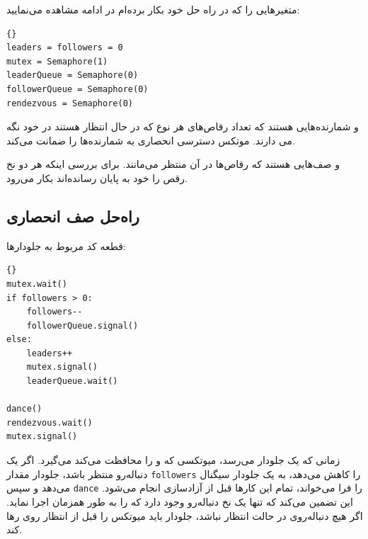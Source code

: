 \documentclass{book}
\newcommand{\clearemptydoublepage}{\newpage\cleardoublepage}
\begin{document}
    متغیرهایی را که در راه حل خود بکار برده‌ام در ادامه مشاهده می‌نمایید:

\begin{latin}
\begin{latin}
\begin{lstlisting}[title={\rl{راهنمای صف}}]{}
leaders = followers = 0
mutex = Semaphore(1)
leaderQueue = Semaphore(0)
followerQueue = Semaphore(0)
rendezvous = Semaphore(0)
\end{lstlisting}
\end{latin}
\end{latin}

     و 
    شمارنده‌هایی هستند که تعداد رقاص‌های هر نوع که در حال انتظار هستند در خود نگه می دارند. 
    موتکس دسترسی انحصاری به شمارنده‌ها را ضمانت می‌کند.

     و 
صف‌هایی هستند که رقاص‌ها در آن  منتظر می‌مانند. 
 برای بررسی اینکه هر دو نخ رقص را خود به پایان‌ رسانده‌اند بکار می‌رود. 


\clearemptydoublepage
\subsection {راه‌حل صف انحصاری}

    قطعه کد مربوط به جلو‌دارها:

\begin{latin}
\begin{latin}
\begin{lstlisting}[title=\rl{راه حل صف (جلودارها)}]{}
mutex.wait()
if followers > 0:
    followers--
    followerQueue.signal()
else:
    leaders++
    mutex.signal()
    leaderQueue.wait()    

dance()
rendezvous.wait()
mutex.signal()
\end{lstlisting}
\end{latin}
\end{latin}

    زمانی که یک جلو‌دار می‌رسد، میوتکسی که   و  را محافظت می‌کند می‌گیرد. 
    اگر یک دنباله‌رو منتظر باشد، جلو‌دار مقدار {\tt followers} را کاهش می‌دهد،  به یک جلو‌دار سیگنال می‌دهد و سپس {\tt dance} را فرا می‌خواند، 
    تمام این‌ کارها  قبل از آزادسازی  انجام می‌شود. 
    این تضمین می‌کند که تنها یک نخ دنباله‌رو وجود دارد که  را به طور همزمان اجرا نماید. 
    اگر هیچ دنباله‌روی در حالت انتظار نباشد، جلو‌دار باید میوتکس را قبل از انتظار روی  رها کند. 
\end{document}
